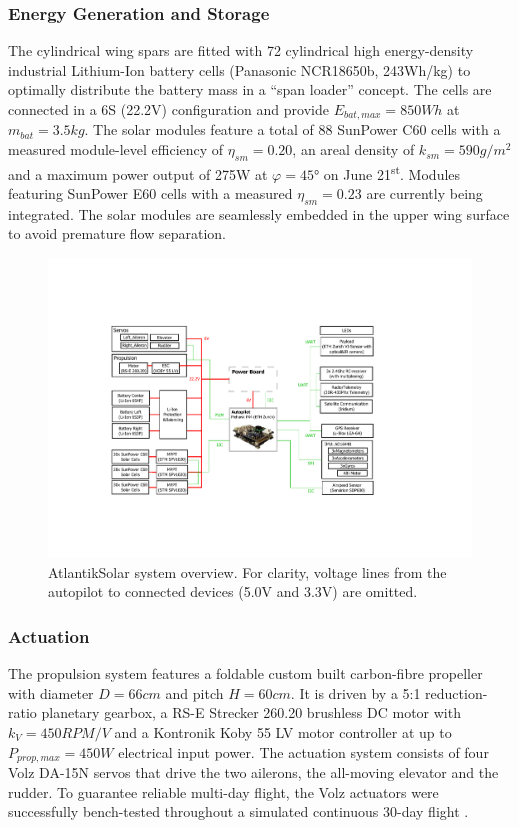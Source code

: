 \subsubsection{Energy Generation and Storage}
The cylindrical wing spars are fitted with 72 cylindrical high energy-density industrial Lithium-Ion battery cells (Panasonic NCR18650b, 243Wh/kg) to optimally distribute the battery mass in a ``span loader'' concept. The cells are connected in a 6S (22.2V) configuration and provide $E_{bat,max}=850Wh$ at $m_{bat}=3.5kg$. The solar modules feature a total of 88 SunPower C60 cells with a measured module-level efficiency of $\eta_{sm}=0.20$, an areal density of $k_{sm}=590g/m^2$ and a maximum power output of 275W at $\varphi=45°$ on June 21\textsuperscript{st}. Modules featuring SunPower E60 cells with a measured \cite{Sunier_EPFLSolarModules} $\eta_{sm}=0.23$ are currently being integrated. The solar modules are seamlessly embedded in the upper wing surface to avoid premature flow separation.

\begin{figure}[tb]
    \centering
     \includegraphics[width=\linewidth]{images/8_AtlantikSolar_Avionics}
    \caption{AtlantikSolar system overview. For clarity, voltage lines from the autopilot to connected devices (5.0V and 3.3V) are omitted.}
    \label{fig:AtlantikSolar_SystemOverview}
\end{figure}

\subsubsection{Actuation}
The propulsion system features a foldable custom built carbon-fibre propeller with diameter $D=66cm$ and pitch $H=60cm$. It is driven by a 5:1 reduction-ratio planetary gearbox, a RS-E Strecker 260.20 brushless DC motor with $k_V=450RPM/V$ and a Kontronik Koby 55 LV motor controller at up to $P_{prop,max}=450W$ electrical input power. The actuation system consists of four Volz DA-15N servos that drive the two ailerons, the all-moving elevator and the rudder. To guarantee reliable multi-day flight, the Volz actuators were successfully bench-tested throughout a simulated continuous 30-day flight \cite{DellaCa_BT}.

